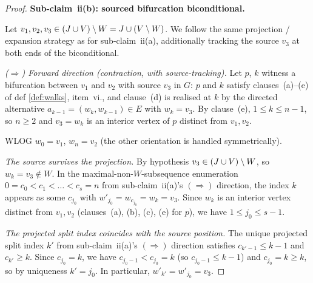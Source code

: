 \documentclass[main]{subfiles}
\begin{document}
\begin{proof}
\medskip\noindent\textbf{Sub-claim~ii(b): sourced bifurcation biconditional.}

Let $v_1, v_2, v_3 \in (J \cup V) \setminus W = J \cup (V \setminus W)$. We follow the same projection / expansion strategy as for sub-claim~ii(a), additionally tracking the source $v_3$ at both ends of the biconditional.

\smallskip\noindent\emph{($\Rightarrow$) Forward direction (contraction, with source-tracking).}
Let $p$, $k$ witness a bifurcation between $v_1$ and $v_2$ with source $v_3$ in $G$: $p$ and $k$ satisfy clauses~(a)--(e) of def \ref{def:walks}, item~vi., and clause~(d) is realised at $k$ by the directed alternative $a_{k-1} = (w_k, w_{k-1}) \in E$ with $w_k = v_3$. By clause~(e), $1 \le k \le n - 1$, so $n \ge 2$ and $v_3 = w_k$ is an interior vertex of $p$ distinct from $v_1, v_2$.

WLOG $w_0 = v_1$, $w_n = v_2$ (the other orientation is handled symmetrically).

\emph{The source survives the projection.} By hypothesis $v_3 \in (J \cup V) \setminus W$, so $w_k = v_3 \notin W$. In the maximal-non-$W$-subsequence enumeration $0 = c_0 < c_1 < \dots < c_s = n$ from sub-claim~ii(a)'s $(\Rightarrow)$ direction, the index $k$ appears as some $c_{j_0}$ with $w'_{j_0} = w_{c_{j_0}} = w_k = v_3$. Since $w_k$ is an interior vertex distinct from $v_1, v_2$ (clauses~(a), (b), (c), (e) for $p$), we have $1 \le j_0 \le s - 1$.

\emph{The projected split index coincides with the source position.} The unique projected split index $k'$ from sub-claim~ii(a)'s $(\Rightarrow)$ direction satisfies $c_{k'-1} \le k - 1$ and $c_{k'} \ge k$. Since $c_{j_0} = k$, we have $c_{j_0 - 1} < c_{j_0} = k$ (so $c_{j_0 - 1} \le k - 1$) and $c_{j_0} = k \ge k$, so by uniqueness $k' = j_0$. In particular, $w'_{k'} = w'_{j_0} = v_3$.


\end{proof}
\end{document}
